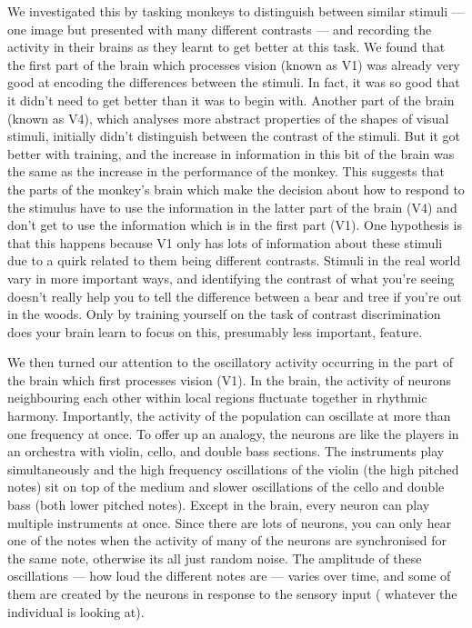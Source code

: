 We investigated this by tasking monkeys to distinguish between similar stimuli --- one image but presented with many different contrasts --- and recording the activity in their brains as they learnt to get better at this task.
We found that the first part of the brain which processes vision (known as \acs{V1}) was already very good at encoding the differences between the stimuli.
In fact, it was so good that it didn't need to get better than it was to begin with.
Another part of the brain (known as \acs{V4}), which analyses more abstract properties of the shapes of visual stimuli, initially didn't distinguish between the contrast of the stimuli.
But it got better with training, and the increase in information in this bit of the brain was the same as the increase in the performance of the monkey.
This suggests that the parts of the monkey's brain which make the decision about how to respond to the stimulus have to use the information in the latter part of the brain (\acs{V4}) and don't get to use the information which is in the first part (\acs{V1}).
One hypothesis is that this happens because \acs{V1} only has lots of information about these stimuli due to a quirk related to them being different contrasts.
Stimuli in the real world vary in more important ways, and identifying the contrast of what you're seeing doesn't really help you to tell the difference between a bear and tree if you're out in the woods.
Only by training yourself on the task of contrast discrimination does your brain learn to focus on this, presumably less important, feature.


We then turned our attention to the oscillatory activity occurring in the part of the brain which first processes vision (\acs{V1}).
In the brain, the activity of neurons neighbouring each other within local regions fluctuate together in rhythmic harmony.
Importantly, the activity of the population can oscillate at more than one frequency at once.
To offer up an analogy, the neurons are like the players in an orchestra with violin, cello, and double bass sections.
The instruments play simultaneously and the high frequency oscillations of the violin (the high pitched notes) sit on top of the medium and slower oscillations of the cello and double bass (both lower pitched notes).
Except in the brain, every neuron can play multiple instruments at once.
Since there are lots of neurons, you can only hear one of the notes when the activity of many of the neurons are synchronised for the same note, otherwise its all just random noise.
The amplitude of these oscillations --- how loud the different notes are --- varies over time, and some of them are created by the neurons in response to the sensory input (\ie{} whatever the individual is looking at).

